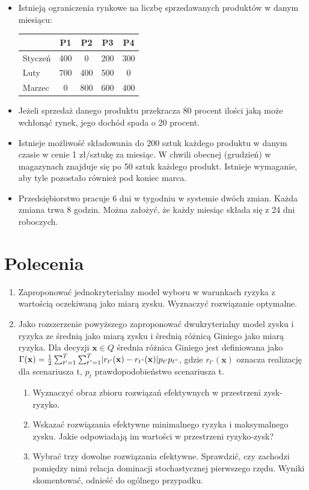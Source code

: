 \documentclass[11pt,a4paper]{article}
\begin{document}
\begin{itemize}
  \item Istnieją ograniczenia rynkowe na liczbę sprzedawanych produktów w danym miesiącu:
  \begin{center}
  \begin{tabular}{l*{4}{c}}
  	\hline
              			& P1 & P2 & P3 & P4 \\
	\hline
	Styczeń 			& 400 & 0 & 200 & 300 \\
	Luty   				& 700 & 400 & 500 & 0 \\
	Marzec 				& 0 & 800 & 600 & 400  \\
	\hline
	\end{tabular}
	\end{center}
	
	\item Jeżeli sprzedaż danego produktu przekracza 80 procent ilości jaką może wchłonąć rynek, jego dochód spada o 20 procent.
	
	\item Istnieje możliwość składowania do 200 sztuk każdego produktu w danym czasie w cenie 1 zł/sztukę za miesiąc. W chwili obecnej (grudzień) w magazynach znajduje się po 50 sztuk każdego produkt. Istnieje wymaganie, aby tyle pozostało również pod koniec marca.
	
	\item Przedsiębiorstwo pracuje 6 dni w tygodniu w systemie dwóch zmian. Każda zmiana trwa 8 godzin. Można założyć, że każdy miesiąc składa się z 24 dni roboczych.
\end{itemize}

\section*{Polecenia}
\begin{enumerate}
  \item Zaproponować jednokryterialny model wyboru w warunkach ryzyka z wartością oczekiwaną jako miarą zysku. Wyznaczyć rozwiązanie optymalne.
  \item Jako rozszerzenie powyższego zaproponować dwukryterialny model zysku i ryzyka ze średnią jako miarą zysku i średnią różnicą Giniego jako miarą ryzyka. Dla decyzji $\mathbf{x}\in Q$ średnia różnica Giniego jest definiowana jako $\Gamma(\mathbf{x})=\frac{1}{2}\sum_{t'=1}^{T}\sum_{t"=1}^{T}\lvert r_{t'}(\mathbf{x})-r_{t"}(\mathbf{x})\rvert p_{t'}p_{t"}$, gdzie $r_{t'}(\mathbf{x})$ oznacza realizację dla scenariusza t, $p_{t}$ prawdopodobieństwo scenariusza t.
  \begin{enumerate}
    \item Wyznaczyć obraz zbioru rozwiązań efektywnych w przestrzeni zysk-ryzyko.
    \item Wskazać rozwiązania efektywne minimalnego ryzyka i maksymalnego zysku. Jakie odpowiadają im wartości w przestrzeni ryzyko-zysk?
    \item Wybrać trzy dowolne rozwiązania efektywne. Sprawdzić, czy zachodzi pomiędzy nimi relacja dominacji stochastycznej pierwszego rzędu. Wyniki skomentować, odnieść do ogólnego przypadku.
  \end{enumerate}
\end{enumerate}
\end{document}

